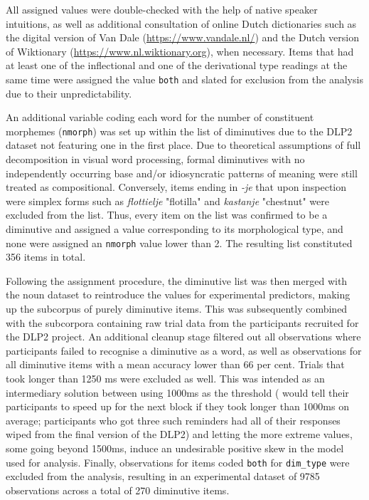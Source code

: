 All assigned values were double-checked with the help of native speaker intuitions, as well as additional consultation of online Dutch dictionaries such as the digital version of Van Dale (\url{https://www.vandale.nl/}) and the Dutch version of Wiktionary (\url{https://www.nl.wiktionary.org}), when necessary. Items that had at least one of the inflectional and one of the derivational type readings at the same time were assigned the value \texttt{both} and slated for exclusion from the analysis due to their unpredictability.

An additional variable coding each word for the number of constituent morphemes (\texttt{nmorph}) was set up within the list of diminutives due to the DLP2 dataset not featuring one in the first place. Due to theoretical assumptions of full decomposition in visual word processing, formal diminutives with no independently occurring base and/or idiosyncratic patterns of meaning were still treated as compositional. Conversely, items ending in \textit{-je} that upon inspection were simplex forms such as \textit{flottielje} "flotilla" and \textit{kastanje} "chestnut" were excluded from the list. Thus, every item on the list was confirmed to be a diminutive and assigned a value corresponding to its morphological type, and none were assigned an \texttt{nmorph} value lower than 2. The resulting list constituted 356 items in total.

Following the assignment procedure, the diminutive list was then merged with the noun dataset to reintroduce the values for experimental predictors, making up the subcorpus of purely diminutive items. This was subsequently combined with the subcorpora containing raw trial data from the participants recruited for the DLP2 project. An additional cleanup stage filtered out all observations where participants failed to recognise a diminutive as a word, as well as observations for all diminutive items with a mean accuracy lower than 66 per cent. Trials that took longer than 1250 ms were excluded as well. This was intended as an intermediary solution between using 1000ms as the threshold (\cite{Brysbaert+etal+2016} would tell their participants to speed up for the next block if they took longer than 1000ms on average; participants who got three such reminders had all of their responses wiped from the final version of the DLP2) and letting the more extreme values, some going beyond 1500ms, induce an undesirable positive skew in the model used for analysis. Finally, observations for items coded \texttt{both} for \texttt{dim\_type} were excluded from the analysis, resulting in an experimental dataset of 9785 observations across a total of 270 diminutive items.

